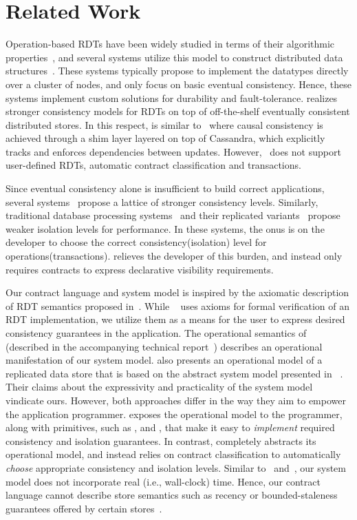 \section{Related Work}
\label{sec:related}

Operation-based RDTs have been widely studied in terms of their algorithmic
properties~\cite{SSS,Burckhardt2014}, and several systems utilize this model to
construct distributed data structures~\cite{Cassandra,Bayou,Tango}. These
systems typically propose to implement the datatypes directly over a cluster of
nodes, and only focus on basic eventual consistency. Hence, these systems
implement custom solutions for durability and fault-tolerance. \name realizes
stronger consistency models for RDTs on top of off-the-shelf eventually consistent
distributed stores. In this respect, \name is similar to~\cite{BoltOn} where
causal consistency is achieved through a shim layer layered on top of Cassandra, which
explicitly tracks and enforces dependencies between updates.
However,~\cite{BoltOn} does not support user-defined RDTs, automatic contract
classification and transactions.

Since eventual consistency alone is insufficient to build correct applications,
several systems~\cite{Bayou,Pileus,RedBlue} propose a lattice of stronger
consistency levels. Similarly, traditional database processing
systems~\cite{Berenson95} and their replicated variants~\cite{BailisHAT}
propose weaker isolation levels for performance. In these systems, the onus is
on the developer to choose the correct consistency(isolation) level for
operations(transactions). \name relieves the developer of this burden, and
instead only requires contracts to express declarative visibility requirements.

Our contract language and system model is inspired by the axiomatic description
of RDT semantics proposed in~\cite{Burckhardt2014}. While ~\cite{Burckhardt2014}
uses axioms for formal verification of an RDT implementation, we utilize them as
a means for the user to express desired consistency guarantees in the
application. The operational semantics of \name (described in the accompanying
technical report~\cite{techrep}) describes an operational manifestation of our
system model. \cite{Burckhardt2015} also presents an operational model of a
replicated data store that is based on the abstract system model presented in
~\cite{Burckhardt2014}. Their claims about the expressivity and practicality of
the system model vindicate ours. However, both approaches differ in the way they
aim to empower the application programmer. \cite{Burckhardt2015} exposes the
operational model to the programmer, along with primitives, such as ,
 and , that make it easy to \emph{implement} required
consistency and isolation guarantees. In contrast, \name completely abstracts
its operational model, and instead relies on contract classification to
automatically \emph{choose} appropriate consistency and isolation levels.
Similar to~\cite{Burckhardt2014} and~\cite{Burckhardt2015}, our system model
does not incorporate real (i.e., wall-clock) time. Hence, our contract language
cannot describe store semantics such as recency or bounded-staleness guarantees
offered by certain stores~\cite{Pileus}.


